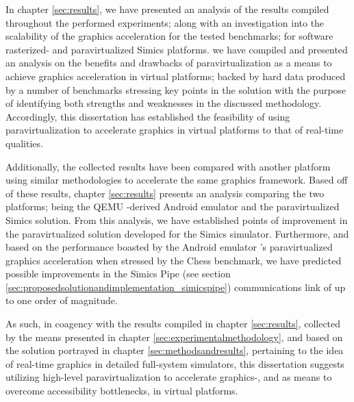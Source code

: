 In chapter \ref{sec:results}, we have presented an analysis of the results compiled throughout the performed experiments; along with an investigation into the scalability of the graphics acceleration for the tested benchmarks; for software rasterized- and paravirtualized Simics platforms.
we have compiled and presented an analysis on the benefits and drawbacks of paravirtualization as a means to achieve graphics acceleration in virtual platforms; backed by hard data produced by a number of benchmarks stressing key points in the solution with the purpose of identifying both strengths and weaknesses in the discussed methodology.
Accordingly, this dissertation has established the feasibility of using paravirtualization to accelerate graphics in virtual platforms to that of real-time qualities.

Additionally, the collected results have been compared with another platform using similar methodologies to accelerate the same graphics framework.
Based off of these results, chapter \ref{sec:results} presents an analysis comparing the two platforms; being the QEMU -derived Android emulator and the paravirtualized Simics solution.
From this analysis, we have established points of improvement in the paravirtualized solution developed for the Simics simulator.
Furthermore, and based on the performance boasted by the Android emulator 's paravirtualized graphics acceleration when stressed by the Chess benchmark, we have predicted possible improvements in the Simics Pipe (see section \ref{sec:proposedsolutionandimplementation_simicspipe}) communications link of up to one order of magnitude.

As such, in coagency with the results compiled in chapter \ref{sec:results}, collected by the means presented in chapter \ref{sec:experimentalmethodology}, and based on the solution portrayed in chapter \ref{sec:methodsandresults}, pertaining to the idea of real-time graphics in detailed full-system simulators, this dissertation suggests utilizing high-level paravirtualization to accelerate graphics-, and as means to overcome accessibility bottlenecks, in virtual platforms.
